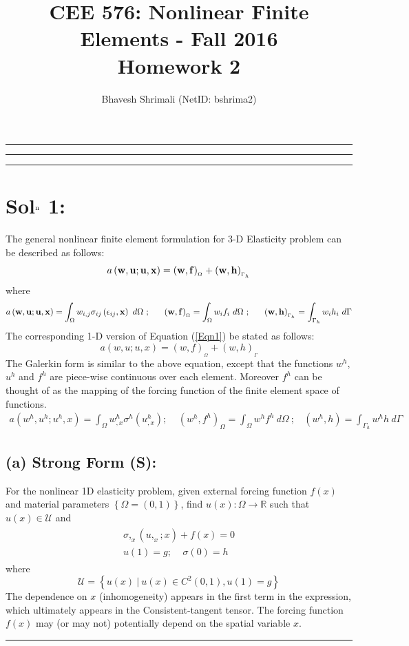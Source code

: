 \documentclass[11pt]{article}
\title{\bf CEE 576: Nonlinear Finite Elements - Fall 2016 \\ Homework 2}
\author{Bhavesh Shrimali (NetID: bshrima2)}
\begin{document}
\maketitle \hrule \hrule \hrule
\section*{Sol$^{\rm n}$ 1:}
The general nonlinear finite element formulation for 3-D Elasticity problem can be described as follows: 
\begin{align}
a
\left({\bf w},{\bf u};{\bf u},{\bf x}
\right)
=
({\bf w},{\bf f})_{_{\Omega}}
+
({\bf w},{\bf h})_{_{\Gamma_h}}
\label{Eqn1}
\end{align}
where 
\[
a
\left({\bf w},{\bf u};{\bf u},{\bf x}
\right)
 = \int_{\Omega} w_{i,j} \sigma_{ij} \left( \epsilon_{ij},{\bf x} \right) \ d \Omega\ ; \ \ \ \ \ 
 ({\bf w},{\bf f})_{_{\Omega}} = \int_{\Omega} w_i f_i \ d \Omega\ ; \ \ \ \ \ ({\bf w},{\bf h})_{_{\Gamma_h}} = \int_{\Gamma_h} w_i h_i\ d\Gamma
\]
The corresponding 1-D version of Equation (\ref{Eqn1}) be stated as follows: 
\[
a(w,u;u,x) = (w,f)_{_{\Omega}} + (w,h)_{_{\Gamma}}
\]
The Galerkin form is similar to the above equation, except that the functions $w^h$, $u^h$ and $f^h$ are piece-wise continuous over each element. Moreover $f^h$ can be thought of as the mapping of the forcing function of the finite element space of functions. 
\begin{align}
a(w^h,u^h;u^h, x) = \int_{\Omega} w^h_{,x} \sigma^h \left( u^h_{,x} \right); \ \ \ \ \ (w^h,f^h)_{\Omega} = \int_{\Omega} w^h f^h\ d\Omega \ ; \ \ \ \ (w^h,h) = \int_{\Gamma_h} w^h h \ d\Gamma 
\end{align}
\subsection*{(a) Strong Form (S):}
For the nonlinear 1D elasticity problem, given external forcing function $f(x)$ and material parameters $\left\{\Omega = (0,1)\right\}$, find $u(x): \Omega \rightarrow \mathbb{R}$ such that $u(x) \in \mathcal{U}$ and 
\begin{align}
\begin{split}
\sigma,_{x} \left(u,_{x}; x \right) + f(x) = 0 \\
u(1) = g; \ \ \ \ \ \sigma(0) = h
\end{split}
\label{StrongForm}
\end{align}
where
\[
\mathcal{U} =  \left\{ u(x)\ | \ u(x) \in C^2 \left( 0,1 \right), u(1) = g \right\} 
\]
The dependence on $x$ (inhomogeneity) appears in the first term in the expression, which ultimately appears in the Consistent-tangent tensor. The forcing function $f(x)$ may (or may not) potentially depend on the spatial variable $x$. \\ \hrule
\end{document}
